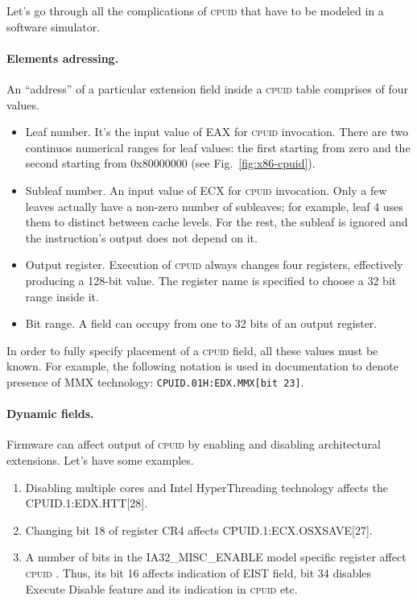 \documentclass[a4paper,10pt,oneside,unicode]{article}
\newcommand{\cpuid}{\textsc{cpuid} }
\begin{document}
Let's go through all the complications of \cpuid that have to be modeled in a software simulator.

\paragraph{Elements adressing.} An “address” of a particular extension field inside a \cpuid table comprises of four values.

\begin{itemize}
\item Leaf number. It's the input value of EAX for \cpuid invocation. There are two continuos numerical ranges for leaf values: the first starting from zero and the second starting from 0x80000000 (see Fig.~\ref{fig:x86-cpuid}).
\item Subleaf number. An input value of ECX for \cpuid invocation. Only a few leaves actually have a non-zero number of subleaves; for example, leaf 4 uses them to distinct between cache levels. For the rest, the subleaf is ignored and the instruction's output does not depend on it.
\item Output register. Execution of \cpuid always changes four registers, effectively producing a 128-bit value. The register name is specified to choose a 32 bit range inside it.
\item Bit range. A field can occupy from one to 32 bits of an output register.
\end{itemize}

In order to fully specify placement of a \cpuid field, all these values must be known. For example, the following notation is used in documentation to denote presence of MMX technology: \texttt{CPUID.01H:EDX.MMX[bit 23]}.


\paragraph{Dynamic fields.} Firmware can affect output of \cpuid by enabling and disabling architectural extensions. Let's have some examples.
\begin{enumerate}
    \item Disabling multiple cores and Intel HyperThreading technology affects the CPUID.1:EDX.HTT[28].
    \item Changing bit 18 of register CR4 affects CPUID.1:ECX.OSXSAVE[27].
    \item A number of bits in the IA32\_MISC\_ENABLE model specific register affect \cpuid. Thus, its bit 16 affects indication of EIST field, bit 34 disables Execute Disable feature and its indication in \cpuid etc.
\end{enumerate}
\end{document}
